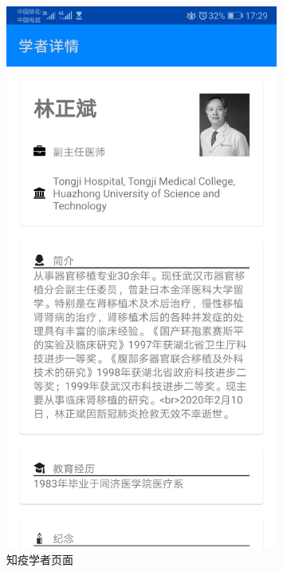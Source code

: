 \documentclass[UTF8]{article}
\begin{document}
\begin{figure}[htbp]
{\begin{minipage}[t]{0.25\linewidth}
    \includegraphics[width=0.8\textwidth]{scholar4}
    \end{minipage}%
    }%

    \centering
    \caption{知疫学者页面}
    \end{figure}

\end{document}
